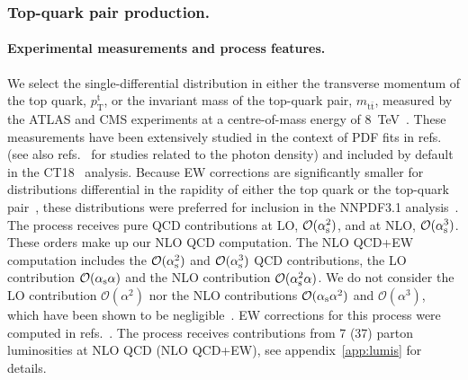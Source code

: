 \subsubsection{Top-quark pair production.}
\label{sec:toppair}

\paragraph{Experimental measurements and process features.}
We select the single-differential distribution in either the transverse
momentum of the top quark, $p_\mathrm{T}^\mathrm{t}$, or the invariant mass of the top-quark
pair, $m_{\mathrm{t}\bar{\mathrm{t}}}$, measured by the ATLAS and CMS experiments at a centre-of-mass
energy of \SI{8}{\tera\electronvolt}~\cite{Aad:2015mbv,Khachatryan:2015oqa}. These measurements have
been extensively studied in the context of PDF fits in
refs.~\cite{Czakon:2016olj,Bailey:2019yze,Amoroso:2020lgh,Kadir:2020yml} (see
also refs.~\cite{Pagani:2016caq,Czakon:2017wor} for studies related to the photon density) and
included by default in the CT18~\cite{Hou:2019efy} analysis.
Because EW corrections are significantly smaller for distributions differential
in the rapidity of either the top quark or the top-quark
pair~\cite{Czakon:2017wor}, these distributions were preferred for inclusion
in the NNPDF3.1 analysis~\cite{Ball:2017nwa}. The process receives
pure QCD contributions at LO, $\mathcal{O}(\alpha_\mathrm{s}^2)$, and
at NLO, $\mathcal{O}(\alpha_\mathrm{s}^3)$. These orders make up our NLO QCD
computation. The NLO QCD+EW computation includes the $\mathcal{O}(\alpha_\mathrm{s}^2)$
and $\mathcal{O}(\alpha_\mathrm{s}^3)$ QCD contributions, the LO contribution
$\mathcal{O}(\alpha_\mathrm{s}\alpha)$ and the NLO contribution
$\mathcal{O}(\alpha_\mathrm{s}^2\alpha)$.
We do not consider the LO contribution $\mathcal{O}(\alpha^2)$ nor the
NLO contributions $\mathcal{O}(\alpha_\mathrm{s}\alpha^2)$ and $\mathcal{O}(\alpha^3)$, which have been shown to be negligible~\cite{Czakon:2017wor,Frederix:2018nkq}.
EW corrections for this process
were computed in refs.~\cite{Bernreuther:2010ny,Hollik:2011ps,Kuhn:2011ri,Bernreuther:2012sx,Pagani:2016caq,Czakon:2017wor,Czakon:2017lgo,Czakon:2017mmr,Czakon:2019bcq,Czakon:2019txp}. The process receives contributions from
7 (37) parton luminosities at NLO QCD (NLO QCD+EW),
see appendix~\ref{app:lumis} for details.

